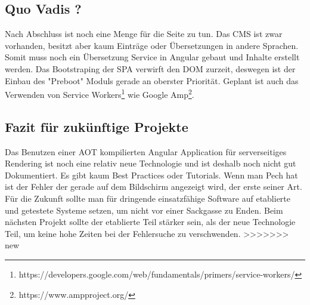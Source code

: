 \documentclass[11pt,a4paper]{article}
\begin{document}
\subsection{Quo Vadis ?}
Nach Abschluss ist noch eine Menge für die Seite zu tun.
Das CMS ist zwar vorhanden, besitzt aber kaum Einträge oder Übersetzungen in andere Sprachen.
Somit muss noch ein Übersetzung Service in Angular gebaut und Inhalte erstellt werden. Das Bootstraping der SPA verwirft den DOM zurzeit, deswegen ist der Einbau des "Preboot" Moduls gerade an oberster Priorität. Geplant ist auch das Verwenden von Service Workers\footnote{https://developers.google.com/web/fundamentals/primers/service-workers/} wie Google Amp\footnote{https://www.ampproject.org/}. 
\subsection{Fazit für zukünftige Projekte}
Das Benutzen einer AOT kompilierten Angular Application für serverseitiges Rendering ist noch eine relativ neue Technologie und ist deshalb noch nicht gut Dokumentiert. Es gibt kaum Best Practices oder Tutorials. Wenn man Pech hat ist der Fehler der gerade auf dem Bildschirm angezeigt wird, der erste seiner Art.\\ Für die Zukunft sollte man für dringende einsatzfähige Software auf etablierte und getestete Systeme setzen, um nicht vor einer Sackgasse zu Enden. Beim nächsten Projekt sollte der etablierte Teil stärker sein, als der neue Technologie Teil, um keine hohe Zeiten bei der Fehlersuche zu verschwenden.
>>>>>>> new
\end{document}
